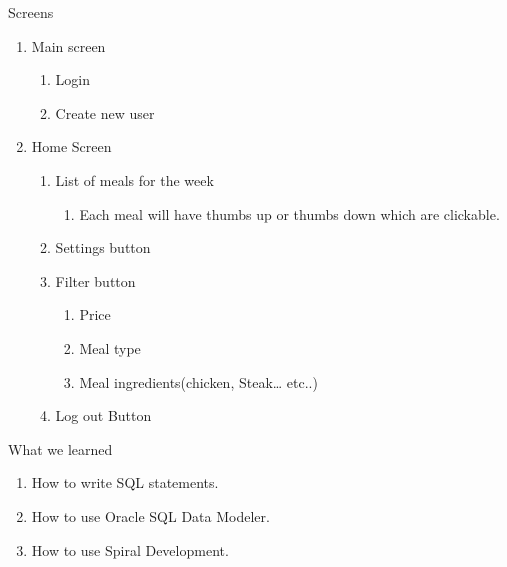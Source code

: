 \documentclass[a4paper,10pt,toc=graduated]{article}
\begin{document}
 
\begin{mySubsection}{Screens}
\renewcommand{\labelenumi}{\arabic{enumi}. }
\renewcommand{\labelenumii}{\arabic{enumi}.\arabic{enumii}. }
\renewcommand{\labelenumiii}{\arabic{enumi}.\arabic{enumii}.\arabic{enumiii}. }
\renewcommand{\labelenumiv}{\arabic{enumi}.\arabic{enumii}.\arabic{enumiii}. }
\renewcommand{\labelenumiv}{\arabic{enumi}.\arabic{enumii}.\arabic{enumiii}.\arabic{enumiv}. }
\begin{enumerate}
\item
Main screen
\begin{enumerate}
\item
Login
\item
Create new user
\end{enumerate}
\item
Home Screen
\begin{enumerate}
\item
List of meals for the week
\begin{enumerate}
\item
Each meal will have thumbs up or thumbs down which are clickable.
\end{enumerate}
\item
Settings button
\item
Filter button
\begin{enumerate}
\item
Price
\item
Meal type
\item
Meal ingredients(chicken, Steak… etc..)
\end{enumerate}
\item
Log out Button
\end{enumerate}
\end{enumerate}
\end{mySubsection}
\begin{mySubsection}{What we learned}
\begin{enumerate}
\item
How to write SQL statements.
\item
How to use Oracle SQL Data Modeler.
\item
How to use Spiral Development.
\end{enumerate}
\end{mySubsection}
\end{document}
